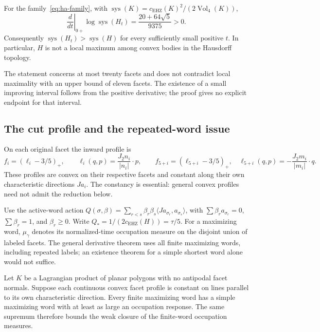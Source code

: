 \begin{theorem}\label{thm:ha-ascent}
For the family~\eqref{eq:ha-family}, with
$\operatorname{sys}(K)=c_{\mathrm{EHZ}}(K)^2/(2\operatorname{Vol}_4(K))$,
\begin{equation}\label{eq:ha-slope}
 \left.\frac{d}{dt}\right|_{0+}\log\operatorname{sys}(H_t)
       =\frac{20+64\sqrt5}{9375}>0.
\end{equation}
Consequently $\operatorname{sys}(H_t)>\operatorname{sys}(H)$ for every
sufficiently small positive $t$. In particular, $H$ is not a local maximum
among convex bodies in the Hausdorff topology.
\end{theorem}

The statement concerns at most twenty facets and does not contradict local
maximality with an upper bound of eleven facets. The existence of a small
improving interval follows from the positive derivative; the proof gives no
explicit endpoint for that interval.

\subsection{The cut profile and the repeated-word issue}

On each original facet the inward profile is
\begin{equation}\label{eq:ha-profile}
 f_i=(\ell_i-3/5)_+,\qquad
 \ell_i(q,p)=\frac{J_2n_i}{|n_i|}\cdot p,
 \qquad
 f_{5+i}=(\ell_{5+i}-3/5)_+,\quad
 \ell_{5+i}(q,p)=-\frac{J_2m_i}{|m_i|}\cdot q.
\end{equation}
These profiles are convex on their respective facets and constant along
their own characteristic directions $Ja_i$. The constancy is essential:
general convex profiles need not admit the reduction below.

Use the active-word action
$Q(\sigma,\beta)=\sum_{r<s}\beta_r\beta_s
\langle Ja_{\sigma_r},a_{\sigma_s}\rangle$, with
$\sum\beta_ra_{\sigma_r}=0$, $\sum\beta_r=1$, and $\beta_r\geq0$.
Write $Q_*=1/(2c_{\mathrm{EHZ}}(H))=\tau/5$.
For a maximizing word, $\mu_\gamma$ denotes its normalized-time occupation
measure on the disjoint union of labeled facets. The general derivative
theorem uses all finite maximizing words, including repeated labels;
an existence theorem for a simple shortest word alone would not suffice.

\begin{lemma}\label{lem:ha-repeat}
Let $K$ be a Lagrangian product of planar polygons with no antipodal facet
normals. Suppose each continuous convex facet profile is constant on lines
parallel to its own characteristic direction. Every finite maximizing word
has a simple maximizing word with at least as large an occupation response.
The same supremum therefore bounds the weak closure of the finite-word
occupation measures.
\end{lemma}

